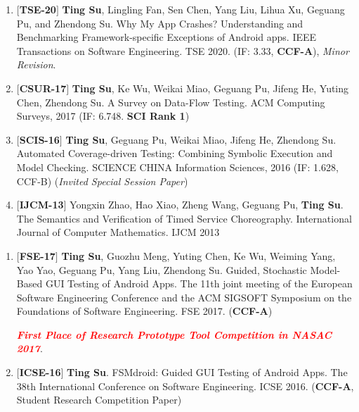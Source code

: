 \documentclass[margin]{res}
\begin{document}
\begin{resume}
\begin{enumerate}[leftmargin=*]
	\item $[$\textbf{TSE-20}$]$ \textbf{Ting Su}, Lingling Fan, Sen Chen, Yang Liu, Lihua Xu, Geguang Pu, and Zhendong Su. Why My App Crashes? Understanding and Benchmarking Framework-specific Exceptions of Android apps. IEEE Transactions on Software Engineering. TSE 2020. (IF: 3.33, \textbf{CCF-A}), \emph{Minor Revision}.
    \item $[$\textbf{CSUR-17}$]$ \textbf{Ting Su}, Ke Wu, Weikai Miao, Geguang Pu, Jifeng He, Yuting Chen, Zhendong Su. A Survey on Data-Flow Testing. ACM Computing Surveys, 2017 (IF: 6.748. \textbf{SCI Rank 1})
    \item $[$\textbf{SCIS-16}$]$ \textbf{Ting Su}, Geguang Pu, Weikai Miao, Jifeng He, Zhendong Su. Automated Coverage-driven Testing: Combining Symbolic Execution and Model Checking. SCIENCE CHINA Information Sciences, 2016 (IF: 1.628, CCF-B) (\emph{Invited Special Session Paper})
    \item $[$\textbf{IJCM-13}$]$ Yongxin Zhao, Hao Xiao, Zheng Wang, Geguang Pu, \textbf{Ting Su}. The Semantics and Verification of Timed Service Choreography. International Journal of Computer Mathematics. IJCM 2013
\end{enumerate}

\begin{enumerate}[leftmargin=*]
	\item $[$\textbf{FSE-17}$]$ \textbf{Ting Su}, Guozhu Meng, Yuting Chen, Ke Wu, Weiming Yang, Yao Yao, Geguang Pu, Yang Liu, Zhendong Su. Guided, Stochastic Model-Based GUI Testing of Android Apps. The 11th joint meeting of the European Software Engineering Conference and the ACM SIGSOFT Symposium on the Foundations of Software Engineering. FSE 2017. (\textbf{CCF-A}) 
	
	\textbf{\emph{\textcolor{red}{First Place of Research Prototype Tool Competition in NASAC 2017}}}.
	\item $[$\textbf{ICSE-16}$]$ \textbf{Ting Su}. FSMdroid: Guided GUI Testing of Android Apps. The 38th International Conference on Software Engineering. ICSE 2016. (\textbf{CCF-A}, Student Research Competition Paper) 
	

\end{enumerate}
\end{resume}
\end{document}
